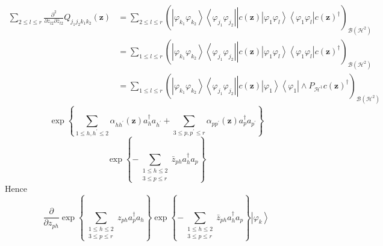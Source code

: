\documentclass[aps,preprint]{revtex4}%
\begin{document}
\begin{align}
\sum\limits_{2\leq l\leq r}\frac{\partial^{2}}{\partial z_{l2}\partial\bar
{z}_{l2}}Q_{j_{1}j_{2}k_{1}k_{2}}\left(  \mathbf{z}\right)   &  =\sum
\limits_{2\leq l\leq r}\left(  \left.  \overset{}{\left\vert \varphi_{k_{1}%
}\varphi_{k_{2}}\right\rangle \left\langle \varphi_{j_{1}}\varphi_{j_{2}%
}\right\vert }\right\vert c\left(  \mathbf{z}\right)  \left\vert \varphi
_{1}\varphi_{l}\right\rangle \left\langle \varphi_{1}\varphi_{l}\right\vert
c\left(  \mathbf{z}\right)  ^{\dagger}\right)  _{\mathcal{B}\left(
\mathcal{H}^{2}\right)  }\\
&  =\sum\limits_{1\leq l\leq r}\left(  \left.  \overset{}{\left\vert
\varphi_{k_{1}}\varphi_{k_{2}}\right\rangle \left\langle \varphi_{j_{1}%
}\varphi_{j_{2}}\right\vert }\right\vert c\left(  \mathbf{z}\right)
\left\vert \varphi_{1}\varphi_{l}\right\rangle \left\langle \varphi_{1}%
\varphi_{l}\right\vert c\left(  \mathbf{z}\right)  ^{\dagger}\right)
_{\mathcal{B}\left(  \mathcal{H}^{2}\right)  }\\
&  =\sum\limits_{1\leq l\leq r}\left(  \left.  \overset{}{\left\vert
\varphi_{k_{1}}\varphi_{k_{2}}\right\rangle \left\langle \varphi_{j_{1}%
}\varphi_{j_{2}}\right\vert }\right\vert c\left(  \mathbf{z}\right)
\left\vert \varphi_{1}\right\rangle \left\langle \varphi_{1}\right\vert \wedge
P_{\mathcal{H}^{1}}c\left(  \mathbf{z}\right)  ^{\dagger}\right)
_{\mathcal{B}\left(  \mathcal{H}^{2}\right)  }%
\end{align}%
\begin{equation}
\exp\left\{  \sum\limits_{1\leq h,h^{\prime}\leq2}\alpha_{hh^{\prime}}\left(
\mathbf{z}\right)  a_{h}^{\dagger}a_{h^{\prime}}+\sum\limits_{3\leq
p,p^{\prime}\leq r}\alpha_{pp^{\prime}}\left(  \mathbf{z}\right)
a_{p}^{\dagger}a_{p^{\prime}}\right\}
\end{equation}%
\begin{equation}
\exp\left\{  -\sum\limits_{\substack{1\leq h\leq2\\3\leq p\leq r}}\bar{z}%
_{ph}a_{h}^{\dagger}a_{p}\right\}
\end{equation}
Hence
\begin{equation}
\frac{\partial}{\partial z_{ph}}\exp\left\{  \sum\limits_{\substack{1\leq
h\leq2\\3\leq p\leq r}}z_{ph}a_{p}^{\dagger}a_{h}\right\}  \exp\left\{
-\sum\limits_{\substack{1\leq h\leq2\\3\leq p\leq r}}\bar{z}_{ph}%
a_{h}^{\dagger}a_{p}\right\}  \left\vert \varphi_{k}\right\rangle
\end{equation}%
\end{document}
